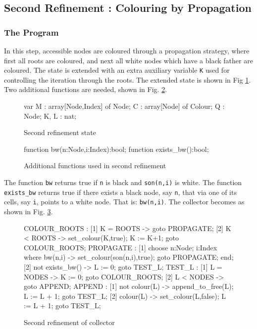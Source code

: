 \subsection{Second Refinement : Colouring by Propagation}
\label{second-refinement}

\subsubsection{The Program}

In this  step,  accessible nodes  are  coloured  through a propagation
strategy, where first all roots are coloured, and next all white nodes
which have a black father are coloured.  The state is extended with an
extra auxiliary variable {\tt K}  used for controlling the  iteration
through  the  roots.   The   extended    state is shown  in Fig \ref{refinement2-state}.
Two  additional    functions are needed, shown 
in Fig. \ref{refinement2-functions}.

\begin{figure}[htb]
\begin{smallsession}
  var
    M : array[Node,Index] of Node;
    C : array[Node] of Colour;
    Q : Node;
    K, L : nat;
\end{smallsession}
\caption{Second refinement state}
\label{refinement2-state}
\end{figure}

\begin{figure}[htb]
\begin{smallsession}
  function bw(n:Node,i:Index):bool;
  function exists_bw():bool;
\end{smallsession}
\caption{Additional functions used in second refinement}
\label{refinement2-functions}
\end{figure}

The function {\tt bw} returns true if {\tt n} is black and {\tt son(n,i)}
is white. The function {\tt exists\_bw} returns true if there exists a
black node,  say {\tt n},  that  via one of  its cells,  say {\tt i},
points to a white node. That is: {\tt bw(n,i)}\@. The collector becomes as
shown in Fig. \ref{refinement2-collector}.

\begin{figure}[htb]
\begin{smallsession}
  COLOUR_ROOTS :
    [1] K = ROOTS -> goto PROPAGATE;
    [2] K < ROOTS -> set_colour(K,true); K := K+1; goto COLOUR_ROOTS;
  PROPAGATE :
    [1] choose n:Node; i:Index where bw(n,i) -> 
          set_colour(son(n,i),true); 
          goto PROPAGATE;
        end;
    [2] not exists_bw() -> L := 0; goto TEST_L;
  TEST_L :
    [1] L = NODES -> K := 0; goto COLOUR_ROOTS;
    [2] L < NODES -> goto APPEND;
  APPEND :
    [1] not colour(L) -> append_to_free(L); L := L + 1; goto TEST_L;
    [2] colour(L) -> set_colour(L,false); L := L + 1; goto TEST_L; 
\end{smallsession}
\caption{Second refinement of collector}
\label{refinement2-collector}
\end{figure}

